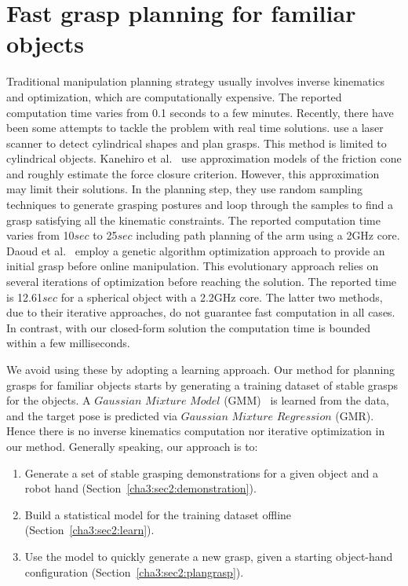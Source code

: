 \section{Fast grasp planning for familiar objects}
\label{cha3:sec2}

Traditional manipulation planning strategy usually involves inverse kinematics and optimization, which are computationally expensive. The reported computation time varies from 0.1 seconds to a few minutes. Recently, there have been some attempts to tackle the problem with real time solutions. \citet{Richtsfeld2008} use a laser scanner to detect cylindrical shapes and plan grasps. This method is limited to cylindrical objects. Kanehiro et al.~\citep{harada2008fast} use approximation models of the friction cone and roughly estimate the force closure criterion. However, this approximation may limit their solutions. In the planning step, they use random sampling techniques to generate grasping postures and loop through the samples to find a grasp satisfying all the kinematic constraints. The reported computation time varies from 10$sec$ to 25$sec$ including path planning of the arm using a 2GHz core.
Daoud et al.~\citep{daoud2011fast} employ a genetic algorithm optimization approach to provide an initial grasp before online manipulation. This evolutionary approach relies on several iterations of optimization before reaching the solution. The reported time is 12.61$sec$ for a spherical object with a 2.2GHz core. The latter two methods, due to their iterative approaches, do not guarantee fast computation in all cases. In contrast, with our closed-form solution the computation time is bounded within a few milliseconds.

We avoid using these by adopting a learning approach.
Our method for planning grasps for familiar objects starts by generating a training dataset of stable grasps for the objects. A $Gaussian$ $Mixture$ $Model$ (GMM)~\citep{cohn1996active} is learned from the data, and the target pose is predicted via $Gaussian$ $Mixture$ $Regression$ (GMR). Hence there is no inverse kinematics computation nor iterative optimization in our method. Generally speaking, our approach is to:
\begin{enumerate}
\item Generate a set of stable grasping demonstrations for a given object and a robot hand (Section~\ref{cha3:sec2:demonstration}).
\item Build a statistical model for the training dataset offline (Section~\ref{cha3:sec2:learn}).
\item Use the model to quickly generate a new grasp, given a starting object-hand configuration (Section~\ref{cha3:sec2:plangrasp}).
\end{enumerate}

